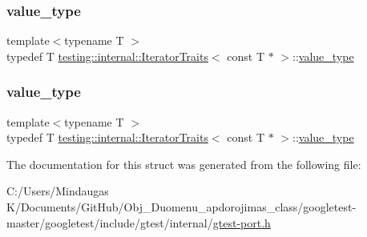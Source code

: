 \mbox{\label{structtesting_1_1internal_1_1_iterator_traits_3_01const_01_t_01_5_01_4_ae7c8867223e106f374b56a7dc4a85547}} 
\subsubsection{\texorpdfstring{value\_type}{value\_type}\hspace{0.1cm}{\footnotesize\ttfamily [2/3]}}
{\footnotesize\ttfamily template$<$typename T $>$ \\
typedef T \mbox{\hyperlink{structtesting_1_1internal_1_1_iterator_traits}{testing\+::internal\+::\+Iterator\+Traits}}$<$ const T $\ast$ $>$\+::\mbox{\hyperlink{structtesting_1_1internal_1_1_iterator_traits_3_01const_01_t_01_5_01_4_ae7c8867223e106f374b56a7dc4a85547}{value\+\_\+type}}}

\mbox{\label{structtesting_1_1internal_1_1_iterator_traits_3_01const_01_t_01_5_01_4_ae7c8867223e106f374b56a7dc4a85547}} 
\subsubsection{\texorpdfstring{value\_type}{value\_type}\hspace{0.1cm}{\footnotesize\ttfamily [3/3]}}
{\footnotesize\ttfamily template$<$typename T $>$ \\
typedef T \mbox{\hyperlink{structtesting_1_1internal_1_1_iterator_traits}{testing\+::internal\+::\+Iterator\+Traits}}$<$ const T $\ast$ $>$\+::\mbox{\hyperlink{structtesting_1_1internal_1_1_iterator_traits_3_01const_01_t_01_5_01_4_ae7c8867223e106f374b56a7dc4a85547}{value\+\_\+type}}}



The documentation for this struct was generated from the following file\+:\begin{DoxyCompactItemize}
\item 
C\+:/\+Users/\+Mindaugas K/\+Documents/\+Git\+Hub/\+Obj\+\_\+\+Duomenu\+\_\+apdorojimas\+\_\+class/googletest-\/master/googletest/include/gtest/internal/\mbox{\hyperlink{googletest-master_2googletest_2include_2gtest_2internal_2gtest-port_8h}{gtest-\/port.\+h}}\end{DoxyCompactItemize}
